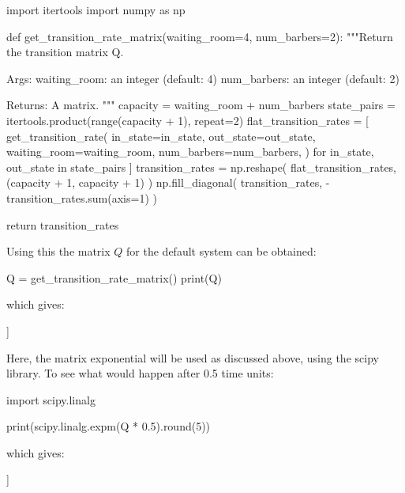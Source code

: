 \begin{pyin}
import itertools
import numpy as np


def get_transition_rate_matrix(waiting_room=4, num_barbers=2):
    """Return the transition matrix Q.

    Args:
        waiting_room: an integer (default: 4)
        num_barbers: an integer (default: 2)

    Returns:
        A matrix.
    """
    capacity = waiting_room + num_barbers
    state_pairs = itertools.product(range(capacity + 1), repeat=2)
    flat_transition_rates = [
        get_transition_rate(
            in_state=in_state,
            out_state=out_state,
            waiting_room=waiting_room,
            num_barbers=num_barbers,
        )
        for in_state, out_state in state_pairs
    ]
    transition_rates = np.reshape(
        flat_transition_rates, (capacity + 1, capacity + 1)
    )
    np.fill_diagonal(
        transition_rates, -transition_rates.sum(axis=1)
    )

    return transition_rates
\end{pyin}

Using this the matrix \(Q\) for the default system can be obtained:

\begin{pyin}
Q = get_transition_rate_matrix()
print(Q)
\end{pyin}

which gives:

\begin{pyout}
[[-10  10   0   0   0   0   0]
 [  4 -14  10   0   0   0   0]
 [  0   8 -18  10   0   0   0]
 [  0   0   8 -18  10   0   0]
 [  0   0   0   8 -18  10   0]
 [  0   0   0   0   8 -18  10]
 [  0   0   0   0   0   8  -8]]
\end{pyout}

Here, the matrix exponential will be used as
discussed above, using the scipy
library. To see what would happen after 0.5 time units:

\begin{pyin}
import scipy.linalg

print(scipy.linalg.expm(Q * 0.5).round(5))
\end{pyin}

which gives:

\begin{pyout}
[[0.10492 0.21254 0.20377 0.17142 0.13021 0.09564 0.0815 ]
 [0.08501 0.18292 0.18666 0.1708  0.14377 0.1189  0.11194]
 [0.06521 0.14933 0.16338 0.16478 0.15633 0.14751 0.15346]
 [0.04388 0.10931 0.13183 0.15181 0.16777 0.18398 0.21142]
 [0.02667 0.07361 0.10005 0.13422 0.17393 0.2189  0.27262]
 [0.01567 0.0487  0.07552 0.11775 0.17512 0.24484 0.32239]
 [0.01068 0.03668 0.06286 0.10824 0.17448 0.25791 0.34914]]
\end{pyout}

